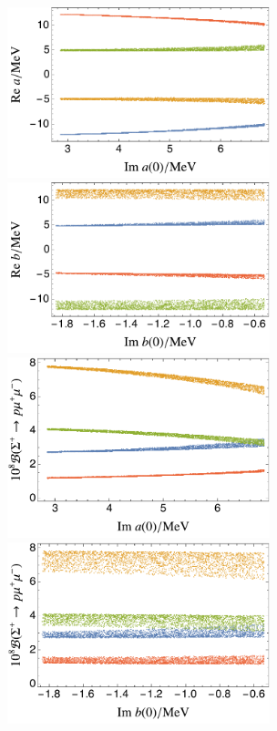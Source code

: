 \documentclass[amsmath,amssymb,aps,nofootinbib,prd,preprint,superscriptaddress,tightenlines,a4paper,bm]{revtex4-2}
\begin{document}
\begin{figure}[b] \bigskip
\includegraphics[width=3in]{reaima.pdf} ~ ~ ~ \includegraphics[width=3in]{rebimb.pdf}
\medskip \\
\includegraphics[width=3in]{imarange.pdf} ~ ~ ~ \includegraphics[width=3in]{imbrange.pdf}
\bigskip \\

\end{figure}
\end{document}
